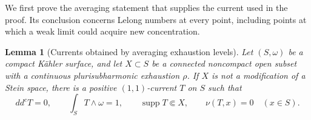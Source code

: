 \documentclass[11pt]{amsart}
\newtheorem{lemma}[theorem]{Lemma}
\theoremstyle{definition}
\theoremstyle{remark}
\numberwithin{equation}{section}
\newcommand{\ddc}{dd^c}
\begin{document}
We first prove the averaging statement that supplies the current used
in the proof.  Its conclusion concerns Lelong numbers at every point,
including points at which a weak limit could acquire new concentration.

\begin{lemma}[Currents obtained by averaging exhaustion levels]
\label{lem:level-averaging}
Let $(S,\omega)$ be a compact K\"ahler surface, and let $X\subset S$
be a connected noncompact open subset with a continuous plurisubharmonic
exhaustion $\rho$.  If $X$ is not a modification of a Stein space,
there is a positive $(1,1)$-current $T$ on $S$ such that
\begin{equation}
\label{eq:averaged-current-properties}
 \ddc T=0,\qquad
 \int_S T\wedge\omega=1,\qquad
 \operatorname{supp}T\Subset X,\qquad
 \nu(T,x)=0\quad(x\in S).
\end{equation}
\end{lemma}
\end{document}
